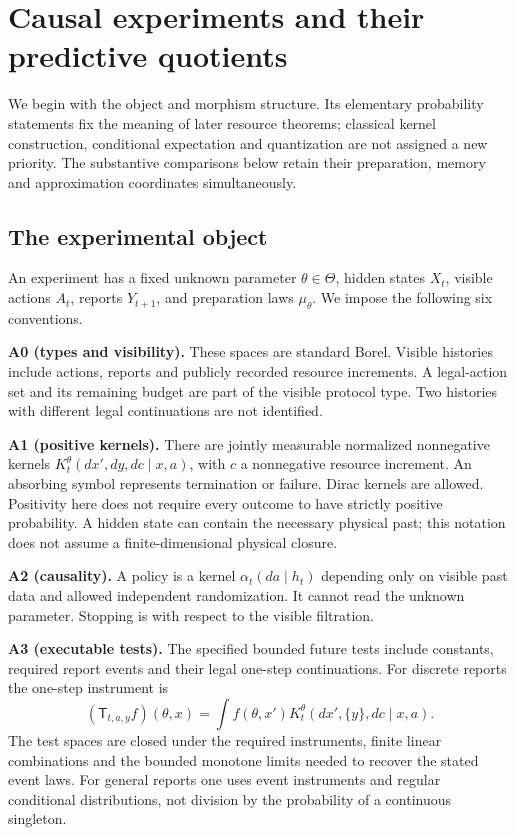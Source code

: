 \section{Causal experiments and their predictive quotients}
\label{sec:foundations}
We begin with the object and morphism structure. Its elementary
probability statements fix the meaning of later resource theorems;
classical kernel construction, conditional expectation and quantization
are not assigned a new priority. The substantive comparisons below
retain their preparation, memory and approximation coordinates
simultaneously.

\subsection{The experimental object}
An experiment has a fixed unknown parameter $\theta\in\Theta$, hidden
states $X_t$, visible actions $A_t$, reports $Y_{t+1}$, and preparation
laws $\mu_\theta$. We impose the following six conventions.

\smallskip\noindent\textbf{A0 (types and visibility).}
These spaces are standard Borel. Visible histories include actions,
reports and publicly recorded resource increments. A legal-action set
and its remaining budget are part of the visible protocol type. Two
histories with different legal continuations are not identified.

\smallskip\noindent\textbf{A1 (positive kernels).}
There are jointly measurable normalized nonnegative kernels
$K_t^\theta(dx',dy,dc\mid x,a)$, with $c$ a nonnegative resource
increment. An absorbing symbol represents termination or failure.
Dirac kernels are allowed. Positivity here does not require every
outcome to have strictly positive probability. A hidden state can
contain the necessary physical past; this notation does not assume a
finite-dimensional physical closure.

\smallskip\noindent\textbf{A2 (causality).}
A policy is a kernel $\alpha_t(da\mid h_t)$ depending only on visible
past data and allowed independent randomization. It cannot read the
unknown parameter. Stopping is with respect to the visible filtration.

\smallskip\noindent\textbf{A3 (executable tests).}
The specified bounded future tests include constants, required report
events and their legal one-step continuations. For discrete reports the
one-step instrument is
\[
 (\mathsf T_{t,a,y}f)(\theta,x)
       =\int f(\theta,x')K_t^\theta(dx',\{y\},dc\mid x,a).
\]
The test spaces are closed under the required instruments, finite
linear combinations and the bounded monotone limits needed to recover
the stated event laws. For general reports one uses event instruments
and regular conditional distributions, not division by the probability
of a continuous singleton.

